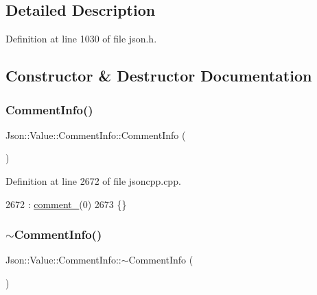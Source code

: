 \subsection{Detailed Description}


Definition at line 1030 of file json.\+h.



\subsection{Constructor \& Destructor Documentation}
\mbox{\label{struct_json_1_1_value_1_1_comment_info_ab23b0c125695d284bded2fb106a49043}} 
\subsubsection{\texorpdfstring{Comment\+Info()}{CommentInfo()}}
{\footnotesize\ttfamily Json\+::\+Value\+::\+Comment\+Info\+::\+Comment\+Info (\begin{DoxyParamCaption}{ }\end{DoxyParamCaption})}



Definition at line 2672 of file jsoncpp.\+cpp.


\begin{DoxyCode}
2672                               : \hyperlink{struct_json_1_1_value_1_1_comment_info_a020f19c7098bab8ec8fec14cd1a5afb9}{comment\_}(0)
2673 \{\}
\end{DoxyCode}
\mbox{\label{struct_json_1_1_value_1_1_comment_info_ab4d0877190bdbf484e4e2a3bade42ac8}} 
\subsubsection{\texorpdfstring{$\sim$\+Comment\+Info()}{~CommentInfo()}}
{\footnotesize\ttfamily Json\+::\+Value\+::\+Comment\+Info\+::$\sim$\+Comment\+Info (\begin{DoxyParamCaption}{ }\end{DoxyParamCaption})}



